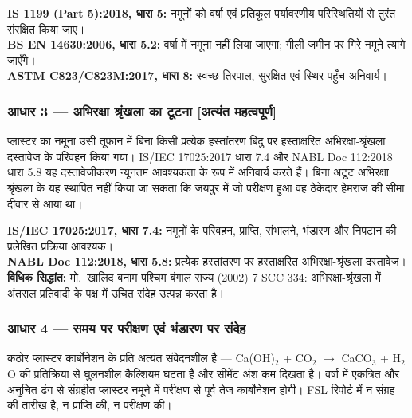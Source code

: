 \documentclass[12pt, a4paper]{article}
\begin{document}
\begin{standardbox}
\textbf{IS 1199 (Part 5):2018, धारा 5:} नमूनों को वर्षा एवं प्रतिकूल पर्यावरणीय परिस्थितियों से तुरंत संरक्षित किया जाए।\\
\textbf{BS EN 14630:2006, धारा 5.2:} वर्षा में नमूना नहीं लिया जाएगा; गीली जमीन पर गिरे नमूने त्यागे जाएँगे।\\
\textbf{ASTM C823/C823M:2017, धारा 8:} स्वच्छ तिरपाल, सुरक्षित एवं स्थिर पहुँच अनिवार्य।
\end{standardbox}

\subsubsection{आधार 3 --- अभिरक्षा श्रृंखला का टूटना \textbf{[अत्यंत महत्वपूर्ण]}}

\begin{groundbox}
प्लास्टर का नमूना उसी तूफान में बिना किसी प्रत्येक हस्तांतरण बिंदु पर हस्ताक्षरित अभिरक्षा-श्रृंखला दस्तावेज के परिवहन किया गया। IS/IEC 17025:2017 धारा 7.4 और NABL Doc 112:2018 धारा 5.8 यह दस्तावेजीकरण न्यूनतम आवश्यकता के रूप में अनिवार्य करते हैं। बिना अटूट अभिरक्षा श्रृंखला के यह स्थापित नहीं किया जा सकता कि जयपुर में जो परीक्षण हुआ वह ठेकेदार हेमराज की सीमा दीवार से आया था।
\end{groundbox}

\begin{standardbox}
\textbf{IS/IEC 17025:2017, धारा 7.4:} नमूनों के परिवहन, प्राप्ति, संभालने, भंडारण और निपटान की प्रलेखित प्रक्रिया आवश्यक।\\
\textbf{NABL Doc 112:2018, धारा 5.8:} प्रत्येक हस्तांतरण पर हस्ताक्षरित अभिरक्षा-श्रृंखला दस्तावेज।\\
\textbf{विधिक सिद्धांत:} मो.\ खालिद बनाम पश्चिम बंगाल राज्य (2002) 7 SCC 334: अभिरक्षा-श्रृंखला में अंतराल प्रतिवादी के पक्ष में उचित संदेह उत्पन्न करता है।
\end{standardbox}

\subsubsection{आधार 4 --- समय पर परीक्षण एवं भंडारण पर संदेह}

कठोर प्लास्टर कार्बोनेशन के प्रति अत्यंत संवेदनशील है --- Ca(OH)$_2$ + CO$_2$ $\rightarrow$ CaCO$_3$ + H$_2$O की प्रतिक्रिया से घुलनशील कैल्शियम घटता है और सीमेंट अंश कम दिखता है। वर्षा में एकत्रित और अनुचित ढंग से संग्रहीत प्लास्टर नमूने में परीक्षण से पूर्व तेज कार्बोनेशन होगी। FSL रिपोर्ट में न संग्रह की तारीख है, न प्राप्ति की, न परीक्षण की।
\end{document}
